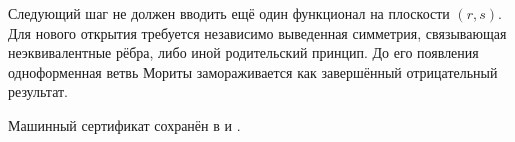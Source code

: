 Следующий шаг не должен вводить ещё один функционал на плоскости $(r,s)$.
Для нового открытия требуется независимо выведенная симметрия, связывающая
неэквивалентные рёбра, либо иной родительский принцип. До его появления
одноформенная ветвь Мориты замораживается как завершённый отрицательный
результат.

Машинный сертификат сохранён в
 и
.